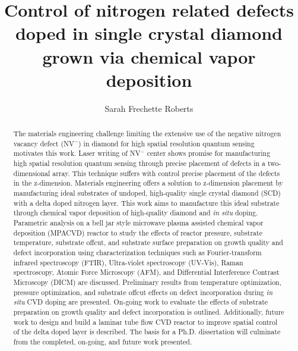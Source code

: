 \documentclass{msuphddissertation_ssn}
\author{Sarah Frechette Roberts} %
\title{Control of nitrogen related defects doped in single crystal diamond grown via chemical vapor deposition} %
\begin{document}
\begin{otherlanguage}{english}
\maketitlepage %
\begin{abstract}
The materials engineering challenge limiting the extensive use of the negative nitrogen vacancy defect (NV$^-$) in diamond for high spatial resolution quantum sensing motivates this work. Laser writing of NV$^-$ center shows promise for manufacturing high spatial resolution quantum sensing through precise placement of defects in a two-dimensional array. This technique suffers with control precise placement of the defects in the z-dimension. Materials engineering offers a solution to z-dimension placement by manufacturing ideal substrates of undoped, high-quality single crystal diamond (SCD) with a delta doped nitrogen layer. This work aims to manufacture this ideal substrate through chemical vapor deposition of high-quality diamond and  \textit{in situ} doping. 
Parametric analysis on a bell jar style microwave plasma assisted chemical vapor deposition (MPACVD) reactor to study the effects of reactor pressure, substrate temperature, substrate offcut, and substrate surface preparation on growth quality and defect incorporation using characterization techniques such as Fourier-transform infrared spectroscopy (FTIR), Ultra-violet spectroscopy (UV-Vis), Raman spectroscopy, Atomic Force Microscopy (AFM), and Differential Interference Contrast Microscopy (DICM) are discussed. Preliminary results from temperature optimization, pressure optimization, and substrate offcut effects on defect incorporation during \textit{in situ} CVD doping are presented. On-going work to evaluate the effects of substrate preparation on growth quality and defect incorporation is outlined. Additionally, future work to design and build a laminar tube flow CVD reactor to improve spatial control of the delta doped layer is described. The basis for a Ph.D. dissertation will culminate from the completed, on-going, and future work presented.
	
\end{abstract}




\end{otherlanguage}
\end{document}
